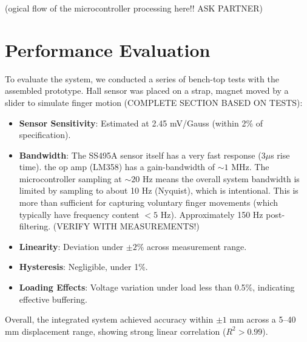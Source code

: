 \documentclass[a4paper,12pt]{article}
\begin{document}
(ogical flow of the microcontroller processing here!! ASK PARTNER)


%
\section{Performance Evaluation}
To evaluate the system, we conducted a series of bench-top tests with the assembled prototype. Hall sensor was placed on a strap, magnet moved by a slider to simulate finger motion (COMPLETE SECTION BASED ON TESTS):
\begin{itemize}
    \item \textbf{Sensor Sensitivity}: Estimated at 2.45 mV/Gauss (within 2\% of specification).
    \item \textbf{Bandwidth}: The SS495A sensor itself has a very fast response ($3 \mu$s rise time). the op amp (LM358) has a gain-bandwidth of $\sim 1$ MHz. The microcontroller sampling at $\sim 20$ Hz means the overall system bandwidth is limited by sampling to about 10 Hz (Nyquist), which is intentional. This is more than sufficient for capturing voluntary finger movements (which typically have frequency content $< 5$ Hz). Approximately 150 Hz post-filtering. (VERIFY WITH MEASUREMENTS!)
    \item \textbf{Linearity}: Deviation under $\pm2\%$ across measurement range.
    \item \textbf{Hysteresis}: Negligible, under 1\%.
    \item \textbf{Loading Effects}: Voltage variation under load less than 0.5\%, indicating effective buffering.
\end{itemize}

Overall, the integrated system achieved accuracy within $\pm 1$ mm across a 5--40 mm displacement range, showing strong linear correlation ($R^2 > 0.99$).


%
\end{document}
